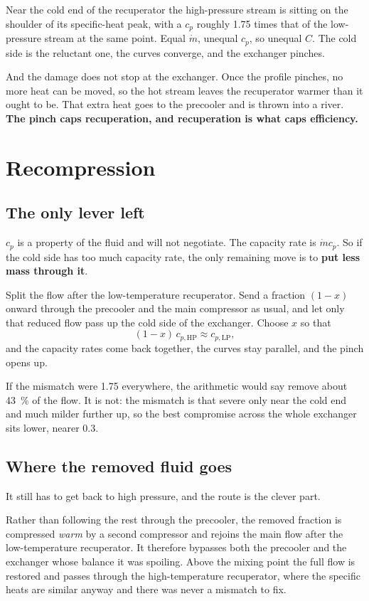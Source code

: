 \documentclass[11pt,a4paper]{report}
\begin{document}
Near the cold end of the recuperator the high-pressure stream is sitting on
the shoulder of its specific-heat peak, with a $c_p$ roughly \num{1.75}
times that of the low-pressure stream at the same point. Equal $\dot m$,
unequal $c_p$, so unequal $C$. The cold side is the reluctant one, the
curves converge, and the exchanger pinches.

And the damage does not stop at the exchanger. Once the profile pinches, no
more heat can be moved, so the hot stream leaves the recuperator warmer than
it ought to be. That extra heat goes to the precooler and is thrown into a
river. \textbf{The pinch caps recuperation, and recuperation is what caps
efficiency.}

\section{Recompression}

\subsection{The only lever left}

$c_p$ is a property of the fluid and will not negotiate. The capacity rate
is $\dot m c_p$. So if the cold side has too much capacity rate, the only
remaining move is to \textbf{put less mass through it}.

Split the flow after the low-temperature recuperator. Send a fraction
$(1-x)$ onward through the precooler and the main compressor as usual, and
let only that reduced flow pass up the cold side of the exchanger. Choose
$x$ so that
\[
  (1-x)\, c_{p,\mathrm{HP}} \approx c_{p,\mathrm{LP}},
\]
and the capacity rates come back together, the curves stay parallel, and
the pinch opens up.

If the mismatch were \num{1.75} everywhere, the arithmetic would say remove
about \SI{43}{\percent} of the flow. It is not: the mismatch is that severe
only near the cold end and much milder further up, so the best compromise
across the whole exchanger sits lower, nearer \num{0.3}.

\subsection{Where the removed fluid goes}

It still has to get back to high pressure, and the route is the clever part.

Rather than following the rest through the precooler, the removed fraction
is compressed \emph{warm} by a second compressor and rejoins the main flow
after the low-temperature recuperator. It therefore bypasses both the
precooler and the exchanger whose balance it was spoiling. Above the mixing
point the full flow is restored and passes through the high-temperature
recuperator, where the specific heats are similar anyway and there was never
a mismatch to fix.
\end{document}

